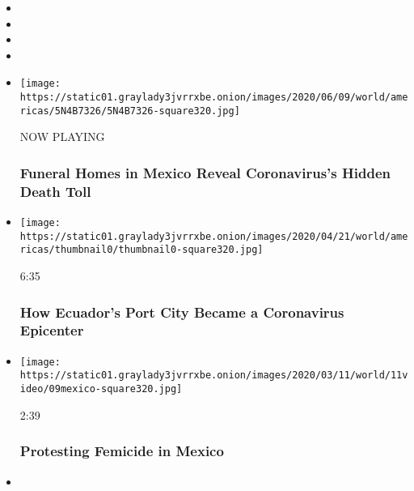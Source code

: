 \begin{itemize}
\item
\item
\item
\item
\end{itemize}

\begin{itemize}
\item
  \texttt{[image: https://static01.graylady3jvrrxbe.onion/images/2020/06/09/world/americas/5N4B7326/5N4B7326-square320.jpg]}

  NOW PLAYING

  \hypertarget{funeral-homes-in-mexico-reveal-coronaviruss-hidden-death-toll-2}{%
  \subsubsection{Funeral Homes in Mexico Reveal Coronavirus's Hidden
  Death
  Toll}\label{funeral-homes-in-mexico-reveal-coronaviruss-hidden-death-toll-2}}
\item
  \href{https://www.nytimes3xbfgragh.onion/video/world/americas/100000007082011/coronavirus-deaths-ecuador-covid-19.html?action=click\&module=video-series-bar\&region=header\&pgtype=Article\&playlistId=video/on-the-ground}{}

  \texttt{[image: https://static01.graylady3jvrrxbe.onion/images/2020/04/21/world/americas/thumbnail0/thumbnail0-square320.jpg]}

  6:35

  \hypertarget{how-ecuadors-port-city-became-a-coronavirus-epicenter}{%
  \subsubsection{How Ecuador's Port City Became a Coronavirus
  Epicenter}\label{how-ecuadors-port-city-became-a-coronavirus-epicenter}}
\item
  \href{https://www.nytimes3xbfgragh.onion/video/world/americas/100000007023396/march-femicide-women-mexico.html?action=click\&module=video-series-bar\&region=header\&pgtype=Article\&playlistId=video/on-the-ground}{}

  \texttt{[image: https://static01.graylady3jvrrxbe.onion/images/2020/03/11/world/11video/09mexico-square320.jpg]}

  2:39

  \hypertarget{protesting-femicide-in-mexico}{%
  \subsubsection{Protesting Femicide in
  Mexico}\label{protesting-femicide-in-mexico}}
\item
  \href{https://www.nytimes3xbfgragh.onion/video/world/americas/100000006930887/migrant-caravan-mexico.html?action=click\&module=video-series-bar\&region=header\&pgtype=Article\&playlistId=video/on-the-ground}{}


\end{itemize}
